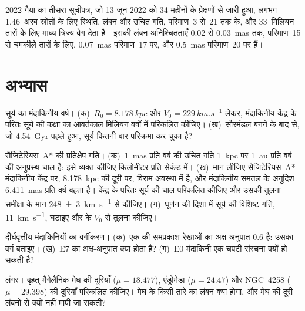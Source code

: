 \begin{dated}{2022}
गैया का तीसरा सूचीपत्र, जो 13 जून 2022 को 34 महीनों के प्रेक्षणों से जारी हुआ,
लगभग 1.46~अरब स्रोतों के लिए स्थिति, लंबन और उचित गति,
परिमाण~3 से~21 तक के, और 33~मिलियन तारों के लिए माध्य त्रिज्य वेग देता है।
इसकी लंबन अनिश्चितताएँ 0.02 से
\qty{0.03}{mas} तक, परिमाण~15 से चमकीले तारों के लिए, \qty{0.07}{mas}
परिमाण~17 पर, और \qty{0.5}{mas} परिमाण~20 पर हैं।
\end{dated}

\section{अभ्यास}

\begin{exercise}[$\star$]\label{exo:b3:milky-way-galaxies:1}
सूर्य का मंदाकिनीय वर्ष। (क)~$R_0 = \qty{8.178}{kpc}$ और
$V_0 = \qty{229}{km.s^{-1}}$ लेकर, मंदाकिनीय केंद्र के परितः सूर्य की कक्षा का आवर्तकाल
मिलियन वर्षों में परिकलित कीजिए। (ख)~सौरमंडल बनने के बाद से, जो
\qty{4.54}{Gyr} पहले हुआ, सूर्य कितनी बार परिक्रमा कर चुका है?
\end{exercise}

\begin{exercise}[$\star$]\label{exo:b3:milky-way-galaxies:2}
सैजिटेरियस~A* की प्रतिक्षेप गति। (क)~\qty{1}{mas} प्रति वर्ष की उचित गति
\qty{1}{kpc} पर \qty{1}{au} प्रति वर्ष की अनुप्रस्थ चाल है: इसे व्यक्त कीजिए
किलोमीटर प्रति सेकंड में। (ख)~मान लीजिए सैजिटेरियस~A* मंदाकिनीय केंद्र पर,
\qty{8.178}{kpc} की दूरी पर, विराम अवस्था में है, और मंदाकिनीय समतल के अनुदिश
\qty{6.411}{mas} प्रति वर्ष बहता है। केंद्र के परितः सूर्य की चाल परिकलित कीजिए और उसकी तुलना
समीक्षा के मान \qty[separate-uncertainty=true]{248 \pm 3}{km.s^{-1}} से कीजिए। (ग)~घूर्णन की दिशा में सूर्य की
विशिष्ट गति, \qty{11}{km.s^{-1}}, घटाइए
और  के $V_0$ से तुलना कीजिए।
\end{exercise}

\begin{exercise}[$\star$]\label{exo:b3:milky-way-galaxies:3}
दीर्घवृत्तीय मंदाकिनियों का वर्गीकरण। (क)~एक  की समप्रकाश-रेखाओं का
अक्ष-अनुपात 0.6 है: उसका वर्ग बताइए। (ख)~E7 का अक्ष-अनुपात क्या होता है?
(ग)~E0 मंदाकिनी एक चपटी संरचना क्यों हो सकती है?
\end{exercise}

\begin{exercise}[$\star$]\label{exo:b3:milky-way-galaxies:4}
लंगर। बृहत् मैगेलैनिक मेघ की दूरियाँ
($\mu = 18.477$), एंड्रोमेडा ($\mu = 24.47$) और NGC~4258
($\mu = 29.398$) की दूरियाँ परिकलित कीजिए। मेघ के किसी तारे का लंबन क्या होगा, और मेघ
की दूरी लंबनों से क्यों नहीं मापी जा सकती?
\end{exercise}

